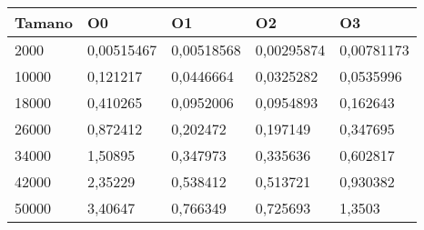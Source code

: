 \begin{tabular}{|l|l|l|l|l|}
	\hline
	Tamano & O0 & O1 & O2 & O3 \\
	\hline
	\hline
	2000 & 0,00515467 & 0,00518568 & 0,00295874 & 0,00781173 \\
	\hline
	10000 & 0,121217 & 0,0446664 & 0,0325282 & 0,0535996 \\
	\hline
	18000 & 0,410265 & 0,0952006 & 0,0954893 & 0,162643 \\
	\hline
	26000 & 0,872412 & 0,202472 & 0,197149 & 0,347695 \\
	\hline
	34000 & 1,50895 & 0,347973 & 0,335636 & 0,602817 \\
	\hline
	42000 & 2,35229 & 0,538412 & 0,513721 & 0,930382 \\
	\hline
	50000 & 3,40647 & 0,766349 & 0,725693 & 1,3503 \\
	\hline
\end{tabular}
